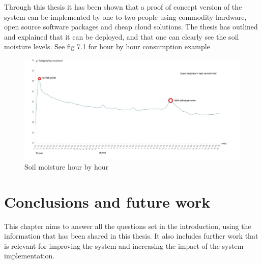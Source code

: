 \documentclass[]{uiophd}
\begin{document}
Through this thesis it has been shown that a proof of concept version of the system can be implemented by one to two people using commodity hardware, open source software packages and cheap cloud solutions. The thesis has outlined and explained that it can be deployed, and that one can clearly see the soil moisture levels. See fig 7.1 for hour by hour consumption example
 \begin{figure}[h]
\caption{Soil moisture hour by hour}
\centering
\includegraphics[width=14cm]{warter_hourbyhour.png}
\end{figure}


\chapter{Conclusions and future work}

This chapter aims to answer all the questions set in the introduction, using the information that has been shared in this thesis. It also includes further work that is relevant for improving the system and increasing the impact of the system implementation.


\\\\
\end{document}
